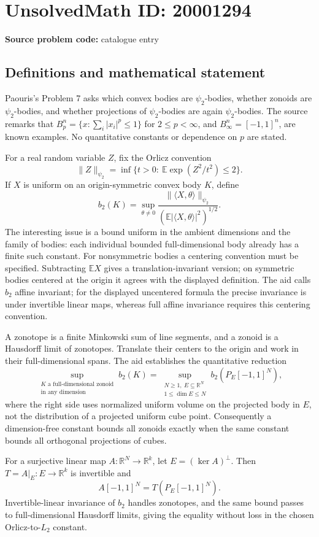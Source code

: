 \documentclass[11pt]{article}
\newcommand{\R}{\mathbb{R}}
\newcommand{\E}{\mathbb{E}}
\begin{document}
\section*{UnsolvedMath ID: 20001294}
\textbf{Source problem code:} catalogue entry
\subsection{Definitions and mathematical statement}
Paouris's Problem 7 asks which convex bodies are \(\psi_2\)-bodies, whether zonoids are \(\psi_2\)-bodies, and whether projections of \(\psi_2\)-bodies are again \(\psi_2\)-bodies. The source remarks that \(B_p^n=\{x:\sum_i|x_i|^p\le1\}\) for \(2\le p<\infty\), and \(B_\infty^n=[-1,1]^n\), are known examples. No quantitative constants or dependence on \(p\) are stated.

For a real random variable \(Z\), fix the Orlicz convention
\[
\|Z\|_{\psi_2}=\inf\{t>0:\ \E\exp(Z^2/t^2)\le2\}.
\]
If \(X\) is uniform on an origin-symmetric convex body \(K\), define
\[
b_2(K)=\sup_{\theta\ne0}\frac{\|\langle X,\theta\rangle\|_{\psi_2}}{(\E|\langle X,\theta\rangle|^2)^{1/2}}.
\]
The interesting issue is a bound uniform in the ambient dimensions and the family of bodies: each individual bounded full-dimensional body already has a finite such constant. For nonsymmetric bodies a centering convention must be specified. Subtracting \(\E X\) gives a translation-invariant version; on symmetric bodies centered at the origin it agrees with the displayed definition. The aid calls \(b_2\) affine invariant; for the displayed uncentered formula the precise invariance is under invertible linear maps, whereas full affine invariance requires this centering convention.

A zonotope is a finite Minkowski sum of line segments, and a zonoid is a Hausdorff limit of zonotopes. Translate their centers to the origin and work in their full-dimensional spans. The aid establishes the quantitative reduction
\[
\sup_{\substack{K\text{ a full-dimensional zonoid}\\\text{in any dimension}}}b_2(K)
=
\sup_{\substack{N\ge1,\ E\subseteq\R^N\\1\le\dim E\le N}}b_2(P_E[-1,1]^N),
\]
where the right side uses normalized uniform volume on the projected body in \(E\), not the distribution of a projected uniform cube point. Consequently a dimension-free constant bounds all zonoids exactly when the same constant bounds all orthogonal projections of cubes.

For a surjective linear map \(A:\R^N\to\R^k\), let \(E=(\ker A)^\perp\). Then \(T=A|_E:E\to\R^k\) is invertible and
\[
A[-1,1]^N=T(P_E[-1,1]^N).
\]
Invertible-linear invariance of \(b_2\) handles zonotopes, and the same bound passes to full-dimensional Hausdorff limits, giving the equality without loss in the chosen Orlicz-to-\(L_2\) constant.
\end{document}
